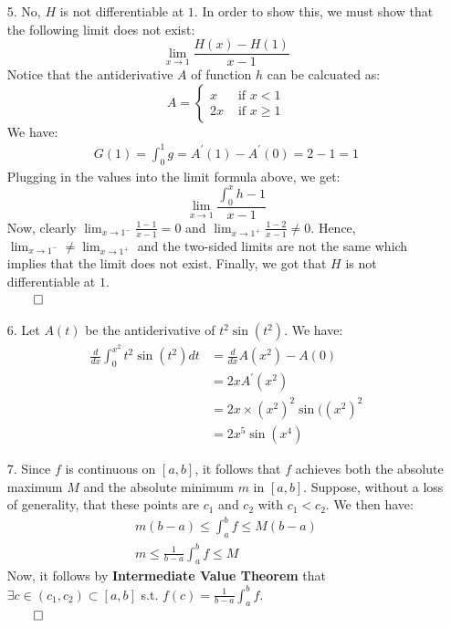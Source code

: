 \documentclass[11pt]{article}
\begin{document}
\begin{itemize}
    \item[5.]
        No, $H$ is not differentiable at $1$. In order to show this, we must
        show that the following limit does not exist:
        \begin{equation*}
            \lim_{x \to 1} \frac{H(x) - H(1)}{x - 1}
        \end{equation*}
        Notice that the antiderivative $A$ of function $h$ can be calcuated as:
        \begin{equation*}
            A =
            \begin{cases}
                x  &\text{ if } x < 1\\
                2x &\text{ if } x \geq 1
            \end{cases}
        \end{equation*}
        We have:
        \begin{align*}
            G(1) = \int_0^1 g = A^\prime(1) - A^\prime(0) = 2 - 1 = 1
        \end{align*}
        Plugging in the values into the limit formula above, we get:
        \begin{equation*}
            \lim_{x \to 1} \frac{\int_0^x h - 1}{x - 1}
        \end{equation*}
        Now, clearly $\lim_{x \to 1^-} \frac{1 - 1}{x - 1} = 0$ and $\lim_{x
        \to 1^+} \frac{1 - 2}{x - 1} \neq 0$. Hence, $\lim_{x \to 1^-} \neq
        \lim_{x \to 1^+}$ and the two-sided limits are not the same which
        implies that the limit does not exist. Finally, we got that $H$ is not
        differentiable at $1$.\\
        $\qed$

    \item[6.]
        Let $A(t)$ be the antiderivative of $t^2\sin (t^2)$. We have:
        \begin{align*}
            \frac{d}{dx} \int_0^{x^2} t^2\sin (t^2) dt
                &= \frac{d}{dx} A(x^2) - A(0)\\
                &= 2x A^\prime(x^2)\\
                &= 2x \times (x^2)^2 \sin ((x^2)^2\\
                &= 2x^5 \sin (x^4)
        \end{align*}

    \item[7.]
        Since $f$ is continuous on $[a, b]$, it follows that $f$ achieves both
        the absolute maximum $M$ and the absolute minimum $m$ in $[a, b]$.
        Suppose, without a loss of generality, that these points are $c_1$ and
        $c_2$ with $c_1 < c_2$. We then have:
        \begin{align}
            m (b - a) \leq \int_a^b f \leq M (b - a)\\
            m \leq \frac{1}{b - a} \int_a^b f \leq M
        \end{align}
        Now, it follows by \textbf{Intermediate Value Theorem} that $\exists c
        \in (c_1, c_2) \subset [a, b]$ s.t. $f(c) = \frac{1}{b - a} \int_a^b
        f$.\\
        $\qed$


\end{itemize}
\end{document}
